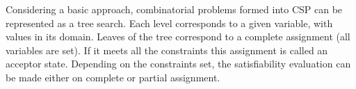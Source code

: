 Considering a basic approach, combinatorial problems formed into CSP can be represented as a tree search. Each level corresponds to a given variable, with values in its domain. Leaves of the tree correspond to a complete assignment (all variables are set). If it meets all the constraints this assignment is called an acceptor state. Depending on the constraints set, the satisfiability evaluation can be made either on complete or partial assignment.
%
%
%
%         
%         
%
%
